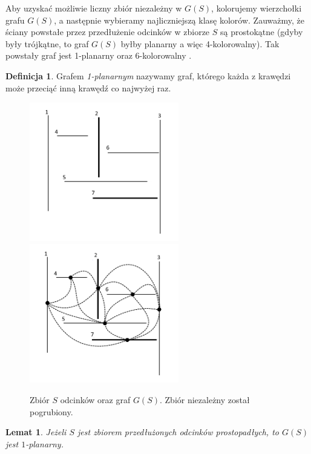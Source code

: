 \documentclass[brudnopis]{xmgr}
\newtheorem{Lemat}{Lemat}
\theoremstyle{definition}
\newtheorem{Definicja}{Definicja}
\begin{document}
\indent Aby uzyskać możliwie liczny zbiór niezależny w $G(S)$, kolorujemy wierzchołki grafu $G(S)$, a następnie wybieramy najliczniejszą klasę kolorów. Zauważmy, że ściany powstałe przez przedłużenie odcinków w zbiorze $S$ są prostokątne (gdyby były trójkątne, to graf $G(S)$ byłby planarny a więc 4-kolorowalny). 
Tak powstały graf jest 1-planarny oraz 6-kolorowalny \cite{borodin}.

\begin{Definicja}
  Grafem \emph{1-planarnym} nazywamy graf, którego każda z krawędzi może przeciąć inną krawędź co najwyżej raz.
\end{Definicja}
\begin{figure}[ht!]
  \centering
  \includegraphics[width=6.5cm]{rysunki/zbior_odcinkow.png}
  \includegraphics[width=6.5cm]{rysunki/graf_zbioru_odcinkow.png}
  \caption{Zbiór $S$ odcinków oraz graf $G(S)$. Zbiór niezależny został pogrubiony.}
  \label{fig:przedluzone odcinki}
\end{figure} 

\begin{Lemat} \cite{knadajniki}
  Jeżeli $S$ jest zbiorem przedłużonych odcinków prostopadłych, to $G(S)$ jest $1$-planarny.
\end{Lemat}
\end{document}
